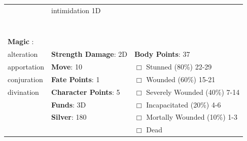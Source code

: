 \documentclass[10pt]{article}
\begin{document}
\begin{table}
\begin{tabular}{m{156pt} m{156pt} m{156pt}}
 \hrulefill & intimidation      1D \hrulefill &  \hrulefill \\

 \hrulefill &  \hrulefill &  \hrulefill \\

 \hrulefill &  \hrulefill &  \hrulefill \\

 \hrulefill &  \hrulefill &  \hrulefill \\

 \hrulefill &  \hrulefill &  \hrulefill \\

 \hrulefill &  \hrulefill &  \hrulefill \\

 \hrulefill &  \hrulefill &  \hrulefill \\

                                  &                                 &                             \\
\textbf{Magic }:  \hrulefill  &                                 &                             \\
alteration           \hrulefill & \textbf{Strength Damage}: 2D \hrulefill                             & \textbf{Body Points}: 37 \hrulefill \\
apportation          \hrulefill                        & \textbf{Move}:             10             \hrulefill    & $\Box$ Stunned \footnotesize{(80\%)} \hfill 22-29 \\
conjuration          \hrulefill                        & \textbf{Fate Points}:      1      \hrulefill    & $\Box$ Wounded \footnotesize{(60\%)} \hfill 15-21 \\
divination           \hrulefill                        & \textbf{Character Points}: 5 \hrulefill    & $\Box$ Severely Wounded \footnotesize{(40\%)} \hfill 7-14 \\
 \hrulefill                        & \textbf{Funds}:            3D            \hrulefill    & $\Box$ Incapacitated \footnotesize{(20\%)} \hfill 4-6 \\
 \hrulefill                        & \textbf{Silver}:           180           \hrulefill    & $\Box$ Mortally Wounded \footnotesize{(10\%)} \hfill 1-3 \\
 \hrulefill                        &  \hrulefill                                                       & $\Box$ Dead   \\
\end{tabular}
\end{table}
\cleardoublepage
\end{document}
